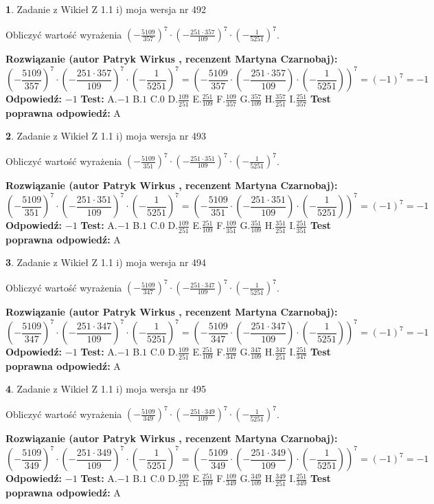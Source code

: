 \documentclass[12pt, a4paper]{article}
\theoremstyle{definition} %
\newtheorem{zad}{}
\newcommand{\zadStart}[1]{\begin{zad}#1\newline}
\newcommand{\zadStop}{\end{zad}}
\newcommand{\rozwStart}[2]{\noindent \textbf{Rozwiązanie (autor #1 , recenzent #2): }\newline}
\newcommand{\rozwStop}{\newline}
\newcommand{\odpStart}{\noindent \textbf{Odpowiedź:}\newline}
\newcommand{\odpStop}{\newline}
\newcommand{\testStart}{\noindent \textbf{Test:}\newline}
\newcommand{\testStop}{\newline}
\newcommand{\kluczStart}{\noindent \textbf{Test poprawna odpowiedź:}\newline}
\newcommand{\kluczStop}{\newline}
\begin{document}
\zadStart{Zadanie z Wikieł Z 1.1 i) moja wersja nr 492}

Obliczyć wartość wyrażenia $(-\frac{5109}{357})^{7} \cdot (-\frac{251 \cdot 357}{109})^{7} \cdot (-\frac{1}{5251})^{7}$.
\zadStop
\rozwStart{Patryk Wirkus}{Martyna Czarnobaj}
$$(-\frac{5109}{357})^{7} \cdot (-\frac{251 \cdot 357}{109})^{7} \cdot (-\frac{1}{5251})^{7} = (-\frac{5109}{357} \cdot (-\frac{251 \cdot 357}{109}) \cdot (-\frac{1}{5251}))^{7} = (-1)^{7} = -1$$
\rozwStop
\odpStart
$-1$
\odpStop
\testStart
A.$-1$ B.$1$ C.$0$ D.$\frac{109}{251}$ E.$\frac{251}{109}$
F.$\frac{109}{357}$ G.$\frac{357}{109}$
H.$\frac{357}{251}$
I.$\frac{251}{357}$
\testStop
\kluczStart
A
\kluczStop



\zadStart{Zadanie z Wikieł Z 1.1 i) moja wersja nr 493}

Obliczyć wartość wyrażenia $(-\frac{5109}{351})^{7} \cdot (-\frac{251 \cdot 351}{109})^{7} \cdot (-\frac{1}{5251})^{7}$.
\zadStop
\rozwStart{Patryk Wirkus}{Martyna Czarnobaj}
$$(-\frac{5109}{351})^{7} \cdot (-\frac{251 \cdot 351}{109})^{7} \cdot (-\frac{1}{5251})^{7} = (-\frac{5109}{351} \cdot (-\frac{251 \cdot 351}{109}) \cdot (-\frac{1}{5251}))^{7} = (-1)^{7} = -1$$
\rozwStop
\odpStart
$-1$
\odpStop
\testStart
A.$-1$ B.$1$ C.$0$ D.$\frac{109}{251}$ E.$\frac{251}{109}$
F.$\frac{109}{351}$ G.$\frac{351}{109}$
H.$\frac{351}{251}$
I.$\frac{251}{351}$
\testStop
\kluczStart
A
\kluczStop



\zadStart{Zadanie z Wikieł Z 1.1 i) moja wersja nr 494}

Obliczyć wartość wyrażenia $(-\frac{5109}{347})^{7} \cdot (-\frac{251 \cdot 347}{109})^{7} \cdot (-\frac{1}{5251})^{7}$.
\zadStop
\rozwStart{Patryk Wirkus}{Martyna Czarnobaj}
$$(-\frac{5109}{347})^{7} \cdot (-\frac{251 \cdot 347}{109})^{7} \cdot (-\frac{1}{5251})^{7} = (-\frac{5109}{347} \cdot (-\frac{251 \cdot 347}{109}) \cdot (-\frac{1}{5251}))^{7} = (-1)^{7} = -1$$
\rozwStop
\odpStart
$-1$
\odpStop
\testStart
A.$-1$ B.$1$ C.$0$ D.$\frac{109}{251}$ E.$\frac{251}{109}$
F.$\frac{109}{347}$ G.$\frac{347}{109}$
H.$\frac{347}{251}$
I.$\frac{251}{347}$
\testStop
\kluczStart
A
\kluczStop



\zadStart{Zadanie z Wikieł Z 1.1 i) moja wersja nr 495}

Obliczyć wartość wyrażenia $(-\frac{5109}{349})^{7} \cdot (-\frac{251 \cdot 349}{109})^{7} \cdot (-\frac{1}{5251})^{7}$.
\zadStop
\rozwStart{Patryk Wirkus}{Martyna Czarnobaj}
$$(-\frac{5109}{349})^{7} \cdot (-\frac{251 \cdot 349}{109})^{7} \cdot (-\frac{1}{5251})^{7} = (-\frac{5109}{349} \cdot (-\frac{251 \cdot 349}{109}) \cdot (-\frac{1}{5251}))^{7} = (-1)^{7} = -1$$
\rozwStop
\odpStart
$-1$
\odpStop
\testStart
A.$-1$ B.$1$ C.$0$ D.$\frac{109}{251}$ E.$\frac{251}{109}$
F.$\frac{109}{349}$ G.$\frac{349}{109}$
H.$\frac{349}{251}$
I.$\frac{251}{349}$
\testStop
\kluczStart
A
\kluczStop
\end{document}
